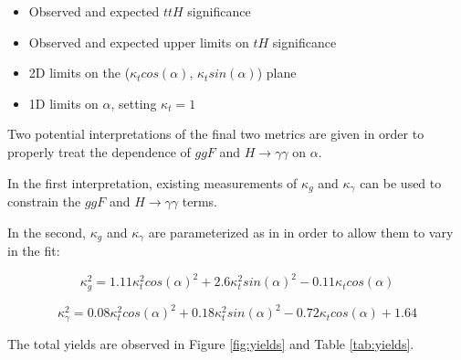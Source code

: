 \begin{itemize}
\item Observed and expected $ttH$ significance
\item Observed and expected upper limits on $tH$ significance
\item 2D limits on the ($\kappa_{t} cos(\alpha)$, $\kappa_{t} sin(\alpha)$) plane
\item 1D limits on $\alpha$, setting $\kappa_{t} = 1$
\end{itemize}

Two potential interpretations of the final two metrics are given in order to properly treat the dependence of $ggF$ and $H \rightarrow \gamma \gamma$ on $\alpha$.

In the first interpretation, existing measurements of $\kappa_{g}$ and $\kappa_{\gamma}$ \cite{couplings80fb} can be used to constrain the $ggF$ and $H \rightarrow \gamma \gamma$ terms. 

In the second, $\kappa_{g}$ and $\kappa_{\gamma}$ are parameterized as in \cite{Ellis} in order to allow them to vary in the fit:

\begin{equation}
\kappa_{g}^{2} = 1.11\kappa_{t}^{2}cos(\alpha)^{2} + 2.6\kappa_{t}^{2}sin(\alpha)^{2} - 0.11\kappa_{t}cos(\alpha) 
\end{equation}

\begin{equation}
\kappa_{\gamma}^{2} = 0.08\kappa_{t}^{2}cos(\alpha)^{2} + 0.18\kappa_{t}^{2}sin(\alpha)^{2} - 0.72\kappa_{t}cos(\alpha) + 1.64
\end{equation}

The total yields are observed in Figure \ref{fig:yields} and Table \ref{tab:yields}.  

